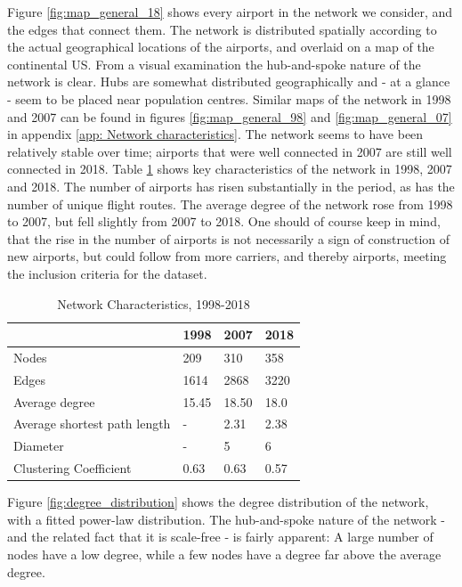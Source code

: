 Figure \ref{fig:map_general_18} shows every airport in the network we consider, and the edges that connect them. The network is distributed spatially according to the actual geographical locations of the airports, and overlaid on a map of the continental US. From a visual examination the hub-and-spoke nature of the network is clear. Hubs are somewhat distributed geographically and - at a glance - seem to be placed near population centres. Similar maps of the network in 1998 and 2007 can be found in figures \ref{fig:map_general_98} and \ref{fig:map_general_07} in appendix \ref{app: Network characteristics}. The network seems to have been relatively stable over time; airports that were well connected in 2007 are still well connected in 2018. Table \ref{tab: temporal} shows key characteristics of the network in 1998, 2007 and 2018. The number of airports has risen substantially in the period, as has the number of unique flight routes. The average degree of the network rose from 1998 to 2007, but fell slightly from 2007 to 2018. One should of course keep in mind, that the rise in the number of airports is not necessarily a sign of construction of new airports, but could follow from more carriers, and thereby airports, meeting the inclusion criteria for the dataset.
\begin{table}[H]
\centering 
\caption{Network Characteristics, 1998-2018}
\label{tab: temporal}
\begin{tabular}{|l|l|l|l|}
\hline
\textbf{}                    & \textbf{1998} & \textbf{2007} & \textbf{2018} \\ \hline
Nodes                        & 209           & 310           & 358           \\
Edges                        & 1614          & 2868          & 3220          \\
Average degree               & 15.45         & 18.50         & 18.0          \\
Average shortest path length & -             & 2.31          & 2.38          \\ 
Diameter                     & -             & 5             & 6 
     \\
Clustering Coefficient       & 0.63          & 0.63          & 0.57          \\ \hline
\end{tabular}
\end{table}
Figure \ref{fig:degree_distribution} shows the degree distribution of the network, with a fitted power-law distribution. The hub-and-spoke nature of the network - and the related fact that it is scale-free - is fairly apparent: A large number of nodes have a low degree, while a few nodes have a degree far above the average degree. 
